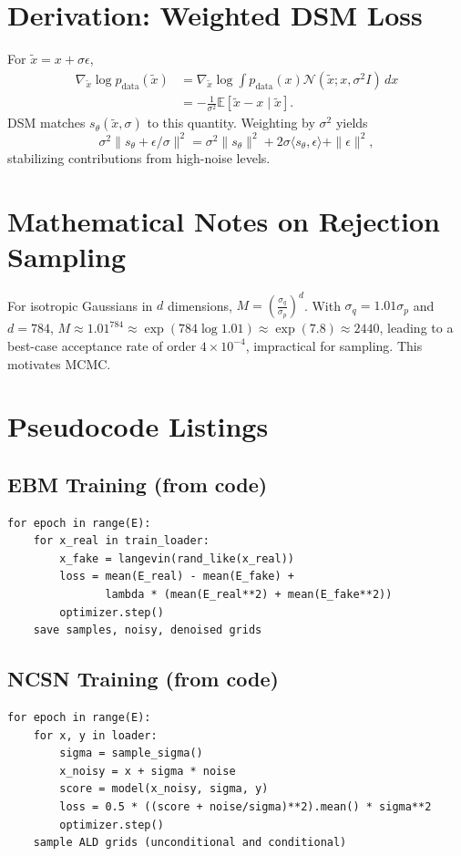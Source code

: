 \documentclass[conference]{IEEEtran}
\begin{document}
\section{Derivation: Weighted DSM Loss}
For $\tilde{x} = x + \sigma \epsilon$,
\begin{align}
    \nabla_{\tilde{x}} \log p_{\text{data}}(\tilde{x}) &= \nabla_{\tilde{x}} \log \int p_{\text{data}}(x) \mathcal{N}(\tilde{x}; x, \sigma^2 I) \, dx \\
    &= -\frac{1}{\sigma^2} \mathbb{E}[ \tilde{x} - x \mid \tilde{x} ].
\end{align}
DSM matches $s_\theta(\tilde{x}, \sigma)$ to this quantity. Weighting by $\sigma^2$ yields
\begin{equation}
    \sigma^2 \big\| s_\theta + \epsilon/\sigma \big\|^2 = \sigma^2 \|s_\theta\|^2 + 2 \sigma \langle s_\theta, \epsilon \rangle + \|\epsilon\|^2,
\end{equation}
stabilizing contributions from high-noise levels.

\section{Mathematical Notes on Rejection Sampling}
For isotropic Gaussians in $d$ dimensions, $M = \left(\frac{\sigma_q}{\sigma_p}\right)^d$. With $\sigma_q = 1.01\sigma_p$ and $d=784$, $M \approx 1.01^{784} \approx \exp(784 \log 1.01) \approx \exp(7.8) \approx 2440$, leading to a best-case acceptance rate of order $4 \times 10^{-4}$, impractical for sampling. This motivates MCMC.

\section{Pseudocode Listings}
\subsection{EBM Training (from code)}
\begin{verbatim}
for epoch in range(E):
    for x_real in train_loader:
        x_fake = langevin(rand_like(x_real))
        loss = mean(E_real) - mean(E_fake) +
               lambda * (mean(E_real**2) + mean(E_fake**2))
        optimizer.step()
    save samples, noisy, denoised grids
\end{verbatim}
\subsection{NCSN Training (from code)}
\begin{verbatim}
for epoch in range(E):
    for x, y in loader:
        sigma = sample_sigma()
        x_noisy = x + sigma * noise
        score = model(x_noisy, sigma, y)
        loss = 0.5 * ((score + noise/sigma)**2).mean() * sigma**2
        optimizer.step()
    sample ALD grids (unconditional and conditional)
\end{verbatim}
\end{document}
